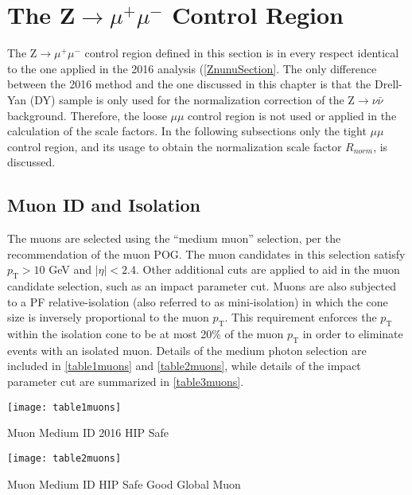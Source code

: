 \section{The Z$\rightarrow\mu^{+}\mu^{-}$ Control Region}

The Z$\rightarrow\mu^{+}\mu^{-}$ control region defined in this section is in every respect identical to the one applied in the 2016 analysis (\autoref{ZnunuSection}. The only difference between the 2016 method and the one discussed in this chapter is that the Drell-Yan (DY) sample is only used for the normalization correction of the Z$\rightarrow\nu\bar{\nu}$ background. Therefore, the loose $\mu\mu$ control region is not used or applied in the calculation of the scale factors. In the following subsections only the tight $\mu\mu$ control region, and its usage to obtain the normalization scale factor $R_{norm}$, is discussed.

\subsection{Muon ID and Isolation}

The muons are selected using the ``medium muon'' selection\cite{muonID}, per the recommendation of the muon POG. The muon candidates in this selection satisfy $p_\text{T} > 10$ GeV and $|\eta| < 2.4$. Other additional cuts are applied to aid in the muon candidate selection, such as an impact parameter cut. Muons are also subjected to a PF relative-isolation (also referred to as mini-isolation) in which the cone size is inversely proportional to the muon $p_\text{T}$. This requirement enforces the $p_\text{T}$ within the isolation cone to be at most 20\% of the muon $p_\text{T}$ in order to eliminate events with an isolated muon. Details of the medium photon selection are included in \autoref{table1muons} and \autoref{table2muons}, while details of the impact parameter cut are summarized in \autoref{table3muons}.

\begin{table}[H]
\begin{center}
\texttt{[image: table1muons]}
\caption{Muon Medium ID 2016 HIP Safe}
\label{table1muons}
\end{center}
\end{table}

\begin{table}[H]
\begin{center}
\texttt{[image: table2muons]}
\caption{Muon Medium ID HIP Safe Good Global Muon}
\label{table2muons}
\end{center}
\end{table}

